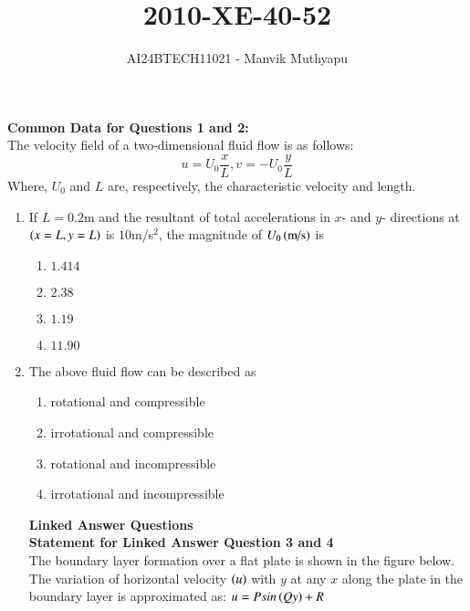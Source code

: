 \documentclass[journal,12pt,onecolumn]{IEEEtran}
\title{2010-XE-40-52}
\author{AI24BTECH11021 - Manvik Muthyapu}
\theoremstyle{remark}
\begin{document}

\maketitle
\bigskip

\renewcommand{\thefigure}{\theenumi}
\renewcommand{\thetable}{\theenumi}

\textbf{Common Data for Questions 1 and 2:}\\

The velocity field of a two-dimensional fluid flow is as follows:
$$u=U_{0}\frac{x}{L}, v=-U_{0}\frac{y}{L}$$
Where, $U_{0}$ and $L$ are, respectively, the characteristic velocity and length.

\begin{enumerate}
\item If $L=0.2$m and the resultant of total accelerations in $x$- and $y$- directions at $\left(x=L ,y=L\right)$ is $10$m/s$^2$, the magnitude of $U_{0}\left(\text{m/s}\right)$ is

\begin{enumerate}
	\item $1.414$
	\item $2.38$
	\item $1.19$
	\item $11.90$
\end{enumerate}

\item The above fluid flow can be described as

\begin{enumerate}
	\item rotational and compressible
	\item irrotational and compressible
	\item rotational and incompressible
	\item irrotational and incompressible\\
\end{enumerate}

\textbf{Linked Answer Questions}\\

\textbf{Statement for Linked Answer Question 3 and 4}\\

The boundary layer formation over a flat plate is shown in the figure below. The variation of horizontal velocity $\left(u\right)$ with $y$ at any $x$ along the plate in the boundary layer is approximated as: $u=Psin\left(Qy\right)+R$\\


\end{enumerate}
\end{document}
